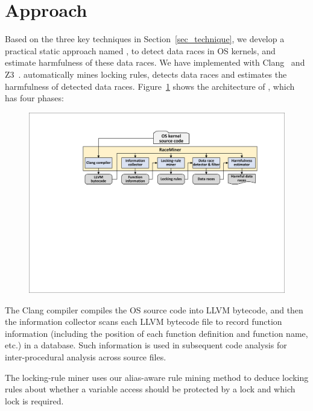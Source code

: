 \section{\sys Approach}
\label{sec_framework}

Based on the three key techniques in Section~\ref{sec_technique}, we develop a 
practical static approach named \sys, to detect data races in OS kernels, and 
estimate harmfulness of these data races. We have implemented \sys with 
Clang~\cite{Clang} and Z3~\cite{Z3}. \sys automatically mines locking rules, 
detects data races and estimates the harmfulness of detected data races. 
Figure~\ref{fig_architecture} shows the architecture of \sys, which has four 
phases:

\begin{figure}[htbp]
	\centering
	\includegraphics[width=1\linewidth]{figures/fig_architecture.pdf}
	\label{fig_architecture}
\end{figure}

 The Clang compiler compiles the OS source 
code into LLVM bytecode, and then the information collector scans each LLVM 
bytecode file to record function information (including the position of each 
function definition and function name, etc.) in a database. Such information is 
used in subsequent code analysis for inter-procedural analysis across source 
files.

 The locking-rule miner uses our alias-aware rule 
mining method to deduce locking rules about whether a variable access should be 
protected by a lock and which lock is required.

